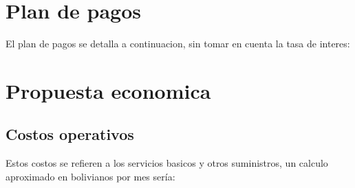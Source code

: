 \section{Plan de pagos}

El plan de pagos se detalla a continuacion, sin tomar en cuenta la tasa de interes:









%




\section{Propuesta economica}

\subsection{Costos operativos}
Estos costos se refieren a los servicios basicos y otros suministros, un calculo aproximado en bolivianos por mes ser\'ia:

